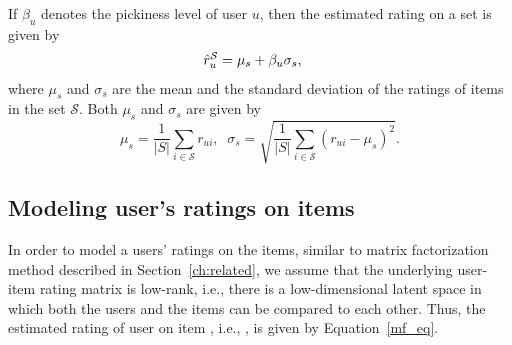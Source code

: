  
If $\beta_u$ denotes the pickiness level of user $u$, then the estimated rating on a set is given by
\begin{equation} \label{varActEq}
  \begin{split}
    \mbox{$\hat{r}_{u}^{\mathcal{S}}$} &= \mu_{s} + \beta_u \sigma_{s},
  \end{split}
\end{equation}
\noindent where $\mu_{s}$ and $\sigma_{s}$ are the mean and the standard
deviation of the ratings of items in the set $\mathcal{S}$.  %
Both $\mu_{s}$ and $\sigma_{s}$ are given by 
\begin{equation}
  \mu_{s} = \frac{1}{|S|} \sum_{i \in \mathcal{S}} r_{ui},\;\;  
  \sigma_{s} = \sqrt{\frac{1}{|S|} \sum_{i \in \mathcal{S}} (r_{ui} -\mu_{s})^2}.
\end{equation}

\iffalse
\noindent since we do not know the original ratings of the items in the sets, we
can estimate rating on the set as
\begin{equation} \label{varEstEq}
  \begin{split}
    \hat{r}_{u}^s &= \hat{\mu}_{s} + \beta_u \hat{\sigma}_{s} ,
  \end{split}
\end{equation}
\noindent where $\hat{\mu}_{s}$ is the mean and $\hat{\sigma}_{s}$ is the standard
deviation of the estimated ratings of items in the set $s$.
\fi


\subsection{Modeling user's ratings on items}
In order to model a users' ratings on the items, similar to matrix factorization method described in
Section~\ref{ch:related}, we assume that the underlying user-item rating matrix is low-rank, i.e.,
there is a low-dimensional latent space in which both the users and the items can be compared to each other. 
Thus, the estimated rating of user \usru on item \itmi, i.e., \ruih, is given by Equation~\ref{mf_eq}.



